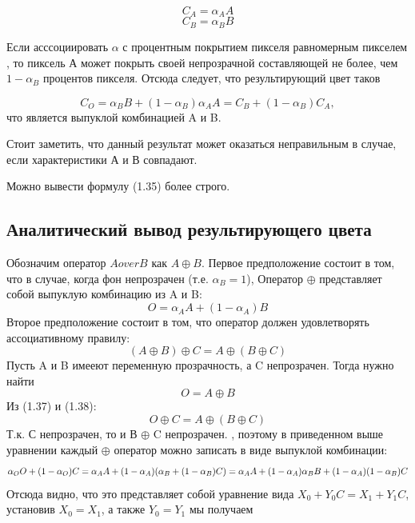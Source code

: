\begin{equation}
C_{A} = \alpha_{A}A 
\end{equation}
\begin{equation}
C_{B} = \alpha_{B}B
\end{equation}

Если асссоциировать $\alpha$ с процентным покрытием пикселя равномерным пикселем \cite{bib8}, то пиксель А может покрыть своей непрозрачной составляющей не более, чем $1- \alpha_{B}$ процентов пикселя.  Отсюда следует, что результирующий цвет таков

\begin{equation}
C_{O} = \alpha_{B}B + (1- \alpha_{B})\alpha_{A}A = C_{B} + (1- \alpha_{B})C_{A},
\end{equation}
что является выпуклой комбинацией A и B.

Стоит заметить, что данный результат может оказаться неправильным в случае, если характеристики  А и В совпадают.  

Можно вывести формулу (1.35) более строго. 
\subsection{Аналитический вывод результирующего цвета}
Обозначим оператор $AoverB$ как $A \oplus B$. 
Первое предположение состоит в том, что в случае, когда фон непрозрачен (т.е. $\alpha _ {B} = 1$), Оператор $\oplus$ представляет собой выпуклую комбинацию из A и B:
\begin{equation}
O= \alpha_{A}A + (1- \alpha_{A})B
\end{equation}
Второе предположение состоит в том, что оператор должен удовлетворять ассоциативному правилу:
\begin{equation}
(A \oplus B) \oplus C = A \oplus (B \oplus C)
\end{equation}
Пусть A и B имееют переменную прозрачность, а C непрозрачен. Тогда нужно найти
\begin{equation}
O = A \oplus B
\end{equation}
Из (1.37) и (1.38):
\begin{equation}
O \oplus C = A \oplus (B \oplus C)
\end{equation}
Т.к. С непрозрачен, то и В $\oplus$ C непрозрачен. , поэтому в приведенном выше уравнении каждый  $\oplus$ оператор можно записать в виде выпуклой комбинации:
\begin{equation}
\alpha_{O}O + (1 - \alpha_{O}) C = \alpha_{A}A + (1 - \alpha_{A})(\alpha_{B} + (1 - \alpha_{B})C) \\
= \alpha_{A}A + (1 - \alpha_{A})\alpha_{B}B + (1-\alpha_{A})(1-\alpha_{B})C
\end{equation}
Отсюда видно, что это представляет собой уравнение вида $ X_{0} + Y_{0} C = X_{1} + Y_{1} C$, установив  $X_{0} = X_{1}$, а также $Y_{0} = Y_ {1}$ мы получаем

